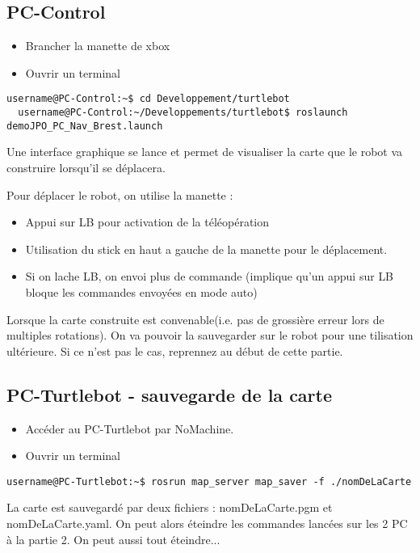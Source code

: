 \documentclass[11pt, a4paper,notitlepage]{article}
\begin{document}
\subsection{PC-Control}\label{sst:bringup:control}
\begin{itemize}
  \item Brancher la manette de xbox
  \item Ouvrir un terminal
\end{itemize}
\begin{lstlisting}[style=Bash]
  username@PC-Control:~$ cd Developpement/turtlebot
  username@PC-Control:~/Developpements/turtlebot$ roslaunch demoJPO_PC_Nav_Brest.launch
\end{lstlisting}
Une interface graphique se lance et permet de visualiser la carte que le robot va construire lorsqu'il se déplacera.

Pour déplacer le robot, on utilise la manette :
\begin{itemize}
  \item Appui sur \textsc{LB} pour activation de la téléopération
  \item Utilisation du stick en haut a gauche de la manette pour le déplacement.
  \item Si on lache \textsc{LB}, on envoi plus de commande (implique qu'un appui sur \textsc{LB} bloque les commandes envoyées en mode auto)
\end{itemize}

Lorsque la carte construite est convenable(i.e. pas de grossière erreur lors de multiples rotations). On va pouvoir la sauvegarder sur le robot pour une tilisation ultérieure. Si ce n'est pas le cas, reprennez au début de cette partie.
\subsection{PC-Turtlebot - sauvegarde de la carte}
\begin{itemize}
  \item Accéder au PC-Turtlebot par NoMachine.
  \item Ouvrir un terminal
\end{itemize}
\begin{lstlisting}[style=Bash]
  username@PC-Turtlebot:~$ rosrun map_server map_saver -f ./nomDeLaCarte
\end{lstlisting}
La carte est sauvegardé par deux fichiers : nomDeLaCarte.pgm et nomDeLaCarte.yaml.
On peut alors éteindre les commandes lancées sur les 2 PC à la partie 2. On peut aussi tout éteindre...
\end{document}
